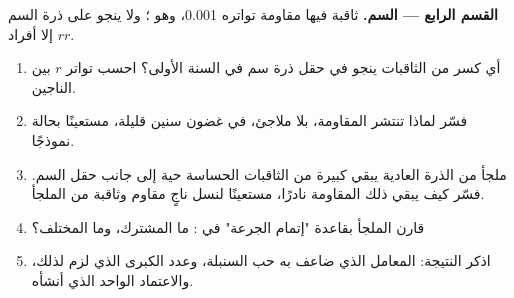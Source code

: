 \begin{problem}
\medskip
\noindent\textbf{القسم الرابع ---  السم.}
 ثاقبة فيها  مقاومة تواتره 0.001، وهو ؛ ولا ينجو على ذرة
السم إلا أفراد $rr$.
\begin{enumerate}[resume]
  \item أي كسر من الثاقبات ينجو في حقل ذرة سم في السنة الأولى؟ احسب
        تواتر $r$ بين الناجين.
  \item فسّر لماذا تنتشر المقاومة، بلا ملاجئ، في غضون سنين قليلة،
        مستعينًا بحالة  نموذجًا.
  \item ملجأ من الذرة العادية يبقي  كبيرة من الثاقبات الحساسة حية
        إلى جانب حقل السم. فسّر كيف يبقي ذلك  المقاومة نادرًا،
        مستعينًا  لنسل ناجٍ مقاوم وثاقبة من الملجأ.
  \item قارن الملجأ بقاعدة "إتمام الجرعة" في : ما المشترك،
        وما المختلف؟
  \item اذكر النتيجة: المعامل الذي ضاعف به  حب السنبلة، وعدد
         الكبرى الذي لزم لذلك، والاعتماد الواحد الذي أنشأه.
\end{enumerate}
\end{problem}
